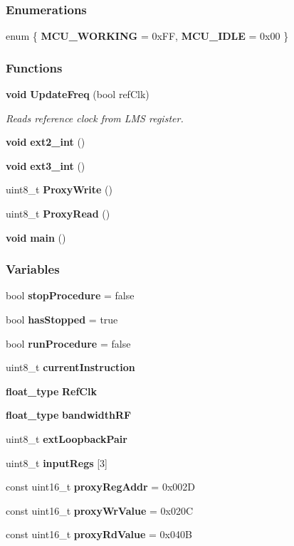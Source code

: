 \subsubsection*{Enumerations}
\begin{DoxyCompactItemize}
\item 
enum \{ {\bf M\+C\+U\+\_\+\+W\+O\+R\+K\+I\+NG} = 0x\+FF, 
{\bf M\+C\+U\+\_\+\+I\+D\+LE} = 0x00
 \}
\end{DoxyCompactItemize}
\subsubsection*{Functions}
\begin{DoxyCompactItemize}
\item 
{\bf void} {\bf Update\+Freq} (bool ref\+Clk)
\begin{DoxyCompactList}\small\item\em Reads reference clock from L\+MS register. \end{DoxyCompactList}\item 
{\bf void} {\bf ext2\+\_\+int} ()
\item 
{\bf void} {\bf ext3\+\_\+int} ()
\item 
uint8\+\_\+t {\bf Proxy\+Write} ()
\item 
uint8\+\_\+t {\bf Proxy\+Read} ()
\item 
{\bf void} {\bf main} ()
\end{DoxyCompactItemize}
\subsubsection*{Variables}
\begin{DoxyCompactItemize}
\item 
bool {\bf stop\+Procedure} = false
\item 
bool {\bf has\+Stopped} = true
\item 
bool {\bf run\+Procedure} = false
\item 
uint8\+\_\+t {\bf current\+Instruction}
\item 
{\bf float\+\_\+type} {\bf Ref\+Clk}
\item 
{\bf float\+\_\+type} {\bf bandwidth\+RF}
\item 
uint8\+\_\+t {\bf ext\+Loopback\+Pair}
\item 
uint8\+\_\+t {\bf input\+Regs} [3]
\item 
const uint16\+\_\+t {\bf proxy\+Reg\+Addr} = 0x002D
\item 
const uint16\+\_\+t {\bf proxy\+Wr\+Value} = 0x020C
\item 
const uint16\+\_\+t {\bf proxy\+Rd\+Value} = 0x040B
\end{DoxyCompactItemize}


